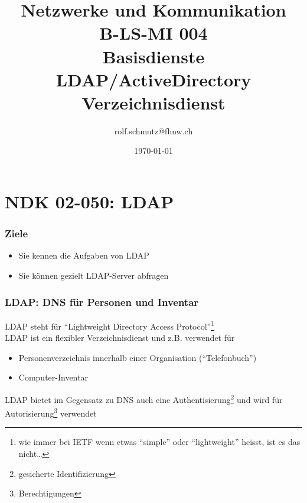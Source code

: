 \documentclass[ignorenonframetext]{beamer}
\date{\today}
\author{rolf.schmutz@fhnw.ch}
\institute{FHNW}
\title{Netzwerke und Kommunikation\\B-LS-MI 004\\Basisdienste\\LDAP/ActiveDirectory Verzeichnisdienst}
\begin{document}

\section{NDK 02-050: LDAP}



\begin{frame}
\titlepage
\end{frame}



\begin{frame}
\frametitle{Ziele}
\begin{itemize}
	\item{Sie kennen die Aufgaben von LDAP}
	\item{Sie k\"onnen gezielt LDAP-Server abfragen}
\end{itemize}
\end{frame}



\begin{frame}
\frametitle{LDAP: DNS f\"ur Personen und Inventar}
LDAP steht f\"ur ``Lightweight Directory Access Protocol''\footnote{wie immer bei IETF wenn etwas ``simple'' oder ``lightweight'' heisst, ist es das nicht\ldots}
\\
\vspace{0.25cm}
LDAP ist ein flexibler Verzeichnisdienst und z.B. verwendet f\"ur
\begin{itemize}
	\item Personenverzeichnis innerhalb einer Organisation (``Telefonbuch'')
	\item Computer-Inventar
\end{itemize}
LDAP bietet im Gegensatz zu DNS auch eine Authentisierung\footnote{gesicherte Identifizierung} und wird f\"ur Autorisierung\footnote{Berechtigungen} verwendet
\end{frame}
\end{document}
